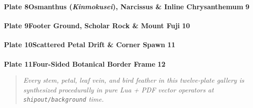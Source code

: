 \documentclass[11pt,a4paper,twoside]{article}
\begin{document}
\noindent\textbf{Plate 8\quad Osmanthus (\emph{Kinmokusei}), Narcissus \& Inline Chrysanthemum} \dotfill \textbf{9}\\
\\[5pt]
\noindent\textbf{Plate 9\quad Footer Ground, Scholar Rock \& Mount Fuji} \dotfill \textbf{10}\\
\\[5pt]
\noindent\textbf{Plate 10\quad Scattered Petal Drift \& Corner Spawn} \dotfill \textbf{11}\\
\hspace*{1.8em}{\small Wind-borne blossoms across all four margins with bottom-right plum spray.}\\[5pt]
\noindent\textbf{Plate 11\quad Four-Sided Botanical Border Frame} \dotfill \textbf{12}

\bigskip
\begin{quote}
\itshape
Every stem, petal, leaf vein, and bird feather in this twelve-plate gallery is synthesized procedurally in pure Lua + PDF vector operators at \texttt{shipout/background} time.
\end{quote}
\end{document}
